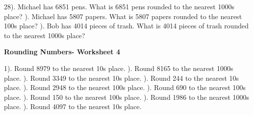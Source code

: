 \documentclass{article}%
\begin{document}
28). Michael has 6851 pens. What is 6851 pens rounded to the nearest 1000s place?%
\newline%
\newline%
). Michael has 5807 papers. What is 5807 papers rounded to the nearest 100s place?%
\newline%
\newline%
). Bob has 4014 pieces of trash. What is 4014 pieces of trash rounded to the nearest 1000s place?%
\newline%
\newline%
\newline%
\pagebreak%
\large%
\begin{center}%
\textbf{Rounding Numbers- Worksheet 4}%
\newline%
\newline%
\newline%
\end{center} \normalsize%
1). Round 8979 to the nearest 10s place.%
\newline%
\newline%
). Round 8165 to the nearest 1000s place.%
\newline%
\newline%
). Round 3349 to the nearest 10s place.%
\newline%
\newline%
). Round 244 to the nearest 10s place.%
\newline%
\newline%
). Round 2948 to the nearest 100s place.%
\newline%
\newline%
). Round 690 to the nearest 100s place.%
\newline%
\newline%
). Round 150 to the nearest 100s place.%
\newline%
\newline%
). Round 1986 to the nearest 1000s place.%
\newline%
\newline%
). Round 4097 to the nearest 10s place.%
\end{document}
